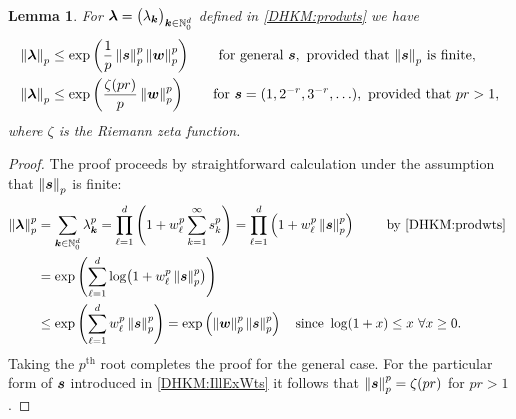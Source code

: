 \documentclass[USenglish]{article}
\theoremstyle{dgthm}
\theoremstyle{dgthm}
\newtheorem{lemma}{Lemma}
\theoremstyle{dgthm}
\theoremstyle{dgthm}
\theoremstyle{dgdef}
\theoremstyle{definition}
\newcommand{\norm}[2][{}]{\ensuremath{\left \lVert #2 \right \rVert}_{#1}}
\begin{document}
{\begin{lemma}\label{DHKM:prodwtsupperbound}
For ${\boldsymbol{\lambda}} = \bigl(\lambda_{{\boldsymbol{k}}} \bigr)_{{\boldsymbol{k}} \in {\mathbb{N}}_0^d}$ defined in \eqref{DHKM:prodwts}
we have 
\begin{align*}
\norm[p]{\bslambda} &\le \exp\left(\frac 1p \norm[p]{\bss}^p \norm[p]{\bsw}^p  \right) \qquad \text{for general } \bss, \text{ provided that  $\norm[p]{\bss}$ is finite},\\
 \norm[p]{\bslambda} & \le \exp\left(\frac {\zeta(pr)}p \norm[p]{\bsw}^p  \right) \qquad \text{for } \bss = (1, 2^{-r}, 3^{-r}, \ldots ), \text{ provided that } pr > 1,
\end{align*}
where $\zeta$ is the Riemann zeta function.
\end{lemma}
\begin{proof}
The proof proceeds by straightforward calculation under the assumption that $\norm[p]{\bss}$ is finite:
\begin{align*}
   \norm[p]{\bslambda}^ p & 
   = \sum_{\bsk \in \NN_0^d} \lambda_{\bsk}^p  
   = \prod_{\ell =1}^d\left(1+ w_\ell^p \sum_{k=1}^{\infty}s_{k}^p\right) 
   = \prod_{\ell =1}^d\left(1+ w_\ell^p \norm[p]{\bss}^p \right) 
   \qquad \text{ by \eqref{DHKM:prodwts} }\\
    & = \exp\left(\sum_{\ell = 1}^d \log\bigl(1 + w_\ell^{p}\norm[p]{\bss}^p \bigr) \right)\\
 &  \le \exp\left(\sum_{\ell = 1}^d  w_\ell^{p} \norm[p]{\bss}^p \right) = \exp\left(\norm[p]{\bsw}^p\norm[p]{\bss}^p \right)
\quad \text{since }\log(1+x) \le x \ \forall x\ge 0.
\end{align*}
Taking the $p^{\text{th}}$ root completes the proof for the general case.  For the particular form of ${\boldsymbol{s}}$ introduced in \eqref{DHKM:IllExWts} it follows that $\norm[p]{\bss}^p = \zeta(pr)$ for $pr > 1$.
\end{proof}

\bigskip

}
\end{document}
